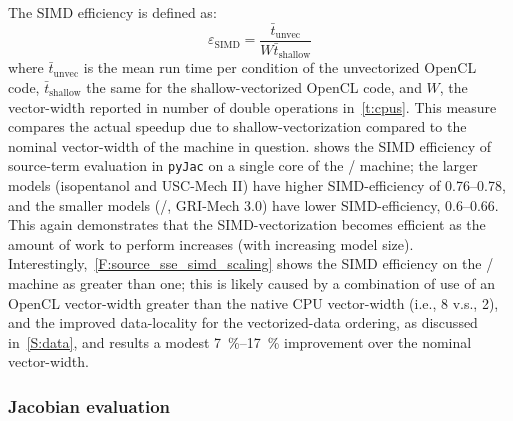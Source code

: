 \documentclass[12pt,number,sort&compress,preprint]{elsarticle}
\begin{document}
The SIMD efficiency is defined as:
\begin{equation}
 \label{e:simd_efficiency}
 \varepsilon_{\text{SIMD}} = \frac{\bar{t}_{\text{unvec}}}{W \bar{t}_{\text{shallow}}}
\end{equation}
where $\bar{t}_{\text{unvec}}$ is the mean run time per condition of the unvectorized OpenCL code, $\bar{t}_{\text{shallow}}$ the same for the shallow-vectorized OpenCL code, and $W$, the vector-width reported in number of double operations in~\cref{t:cpus}.
This measure compares the actual speedup due to shallow-vectorization compared to the nominal vector-width of the machine in question.
 shows the SIMD efficiency of source-term evaluation in \texttt{pyJac} on a single core of the \avx/ machine; the larger models (isopentanol and USC-Mech II) have higher SIMD-efficiency of \numrange{0.76}{0.78}, and the smaller models (\slash{}, GRI-Mech \num{3.0}) have lower SIMD-efficiency, \numrange{0.6}{0.66}.
This again demonstrates that the SIMD-vectorization becomes efficient as the amount of work to perform increases (with increasing model size).
Interestingly,~\cref{F:source_sse_simd_scaling} shows the SIMD efficiency on the \sse/ machine as greater than one; this is likely caused by a combination of use of an OpenCL vector-width greater than the native CPU vector-width (i.e., \num{8} v.s., \num{2}), and the improved data-locality for the vectorized-data ordering, as discussed in~\cref{S:data}, and results a modest \SIrange{7}{17}{\percent} improvement over the nominal vector-width.


\subsubsection{Jacobian evaluation}
\label{S:jacobian_results}
\end{document}
